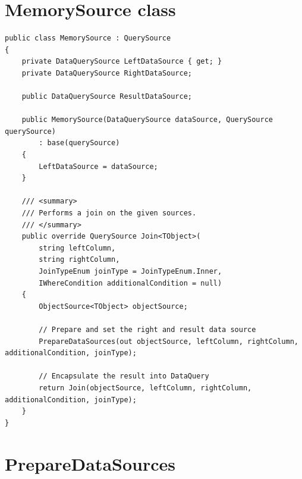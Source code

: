 \documentclass[
  print,
  table,
  nolof,
  nolot,
  nocover,
  oneside
]{fithesis3}
\begin{document}
\section{MemorySource class}
\label{memorysource_class}

\begin{lstlisting}
public class MemorySource : QuerySource
{
    private DataQuerySource LeftDataSource { get; }
    private DataQuerySource RightDataSource;

    public DataQuerySource ResultDataSource;

    public MemorySource(DataQuerySource dataSource, QuerySource querySource)
        : base(querySource)
    {
        LeftDataSource = dataSource;
    }
    
    /// <summary>
    /// Performs a join on the given sources.
    /// </summary>
    public override QuerySource Join<TObject>(
        string leftColumn,
        string rightColumn,
        JoinTypeEnum joinType = JoinTypeEnum.Inner,
        IWhereCondition additionalCondition = null)
    {
        ObjectSource<TObject> objectSource;
    
        // Prepare and set the right and result data source
        PrepareDataSources(out objectSource, leftColumn, rightColumn, additionalCondition, joinType);

        // Encapsulate the result into DataQuery
        return Join(objectSource, leftColumn, rightColumn, additionalCondition, joinType);
    }
}
\end{lstlisting}
\newpage


\section{PrepareDataSources}
\label{preparedatasources}
\end{document}
